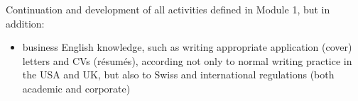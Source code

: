 Continuation and development of all activities defined in Module 1, but in addition:
\begin{itemize}
    \item business English knowledge, such as writing appropriate application (cover) letters and CVs (résumés), according not only to normal writing practice in the USA and UK, but also to Swiss and international regulations (both academic and corporate)
\end{itemize}